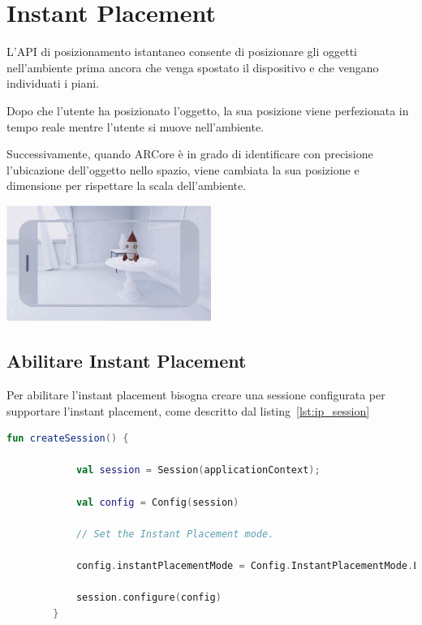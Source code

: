 \documentclass[crop=false, class=book]{standalone}
\begin{document}
	\chapter{Instant Placement}
	L'API di posizionamento istantaneo consente di posizionare gli oggetti nell’ambiente prima ancora che venga spostato il dispositivo e che vengano individuati i piani.
	
	Dopo che l’utente ha posizionato l’oggetto, la sua posizione viene perfezionata in tempo reale mentre l’utente si muove nell’ambiente.
	
	Successivamente, quando ARCore è in grado di identificare con precisione l’ubicazione dell’oggetto nello spazio, viene cambiata la sua posizione e dimensione per rispettare la scala dell’ambiente.
	\begin{center}
	\includegraphics[width=0.5\textwidth]{./resources/images/InstantPlacement/InstantPlacementImg.jpg} 
	\end{center}
	\section{Abilitare Instant Placement}
	Per abilitare l’instant placement bisogna creare una sessione configurata per supportare l’instant placement, come descritto dal listing~\vref{lst:ip_session}
		
	\begin{center}
		\begin{minipage}{0.95\textwidth}
		\begin{lstlisting}[caption={Descrizione del listing.}, label={lst:ip_session}, language=Kotlin]
		fun createSession() {
		
			val session = Session(applicationContext);
			
			val config = Config(session)
			
			// Set the Instant Placement mode.
			
			config.instantPlacementMode = Config.InstantPlacementMode.LOCAL_Y_UP
			
			session.configure(config)
		}
		\end{lstlisting}
		\end{minipage}
	\end{center}
\end{document}
